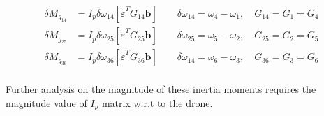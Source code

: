 \begin{align*}
    \delta M_{g_{14}} &=   I_p \delta \omega_{14} \left[\dot \varepsilon^T  G_{1 4} \pmb b \right] \qquad \delta \omega_{14} = \omega_4 - \omega_1, \quad G_{14} = G_1 = G_4\\
    \delta M_{g_{25}} &=   I_p \delta \omega_{25} \left[\dot \varepsilon^T  G_{2 5} \pmb b \right] \qquad \delta \omega_{25} = \omega_5 - \omega_2, \quad G_{25} = G_2 = G_5\\
    \delta M_{g_{36}} &=   I_p \delta \omega_{36} \left[\dot \varepsilon^T  G_{3 6} \pmb b \right] \qquad \delta \omega_{14} = \omega_6 - \omega_3, \quad G_{36} = G_3 = G_6\\
\end{align*}

Further analysis on the magnitude of these inertia moments requires the magnitude value of $I_p$ matrix w.r.t to the drone.
